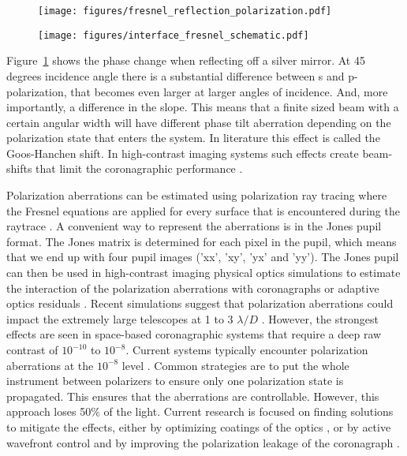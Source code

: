 \documentclass[letterpaper]{ar-1col}
\newcommand{\ld}{$\lambda/D$}
\begin{document}
\begin{figure}[ht]
  \centering
  \texttt{[image: figures/fresnel\_reflection\_polarization.pdf]}
  \caption{}
  \label{fig:fresnel_equations}
\end{figure}

\begin{figure}[ht]
  \centering
  \texttt{[image: figures/interface\_fresnel\_schematic.pdf]}
  \caption{}
  \label{fig:fresnel_interface}
\end{figure}

Figure~\ref{fig:fresnel_equations} shows the phase change when reflecting off a silver mirror. At 45 degrees incidence angle there is a substantial difference between s and p-polarization, that becomes even larger at larger angles of incidence. And, more importantly, a difference in the slope. This means that a finite sized beam with a certain angular width will have different phase tilt aberration depending on the polarization state that enters the system. In literature this effect is called the Goos-Hanchen shift. In high-contrast imaging systems such effects create beam-shifts that limit the coronagraphic performance \citep{Schmid18, millar2022polarization}.

Polarization aberrations can be estimated using polarization ray tracing where the Fresnel equations are applied for every surface that is encountered during the raytrace \citep{ashcraft2023poke}. A convenient way to represent the aberrations is in the Jones pupil format. The Jones matrix is determined for each pixel in the pupil, which means that we end up with four pupil images ('xx', 'xy', 'yx' and 'yy'). The Jones pupil can then be used in high-contrast imaging physical optics simulations to estimate the interaction of the polarization aberrations with coronagraphs \citep{Anche23} or adaptive optics residuals \citep{millar2022polarization}. Recent simulations suggest that polarization aberrations could impact the extremely large telescopes at 1 to 3 \ld{} \citep{Anche23}. However, the strongest effects are seen in space-based coronagraphic systems that require a deep raw contrast of $10^{-10}$ to $10^{-8}$. Current systems typically encounter polarization aberrations at the $10^{-8}$ level \citep{mawet2011recent, seo2019testbed, baudoz2024polarization}. Common strategies are to put the whole instrument between polarizers to ensure only one polarization state is propagated. This ensures that the aberrations are controllable. However, this approach loses 50\% of the light. Current research is focused on finding solutions to mitigate the effects, either by optimizing coatings of the optics \citep{balasubramanian2005polarization,miller2022birefringent}, or by active wavefront control \citep{mendillo2021dual} and by improving the polarization leakage of the coronagraph \citep{Doelman20, Doelman23}.
\end{document}
